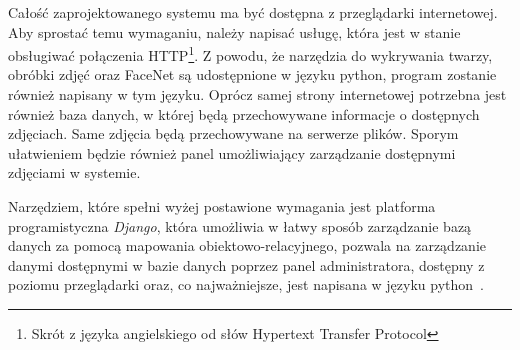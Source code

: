 Całość zaprojektowanego systemu ma być dostępna z przeglądarki internetowej.
Aby sprostać temu wymaganiu, należy napisać usługę, która jest w stanie obsługiwać połączenia
HTTP\footnote{Skrót z języka angielskiego od słów Hypertext Transfer Protocol}.
Z powodu, że narzędzia do wykrywania twarzy, obróbki zdjęć oraz FaceNet są udostępnione w języku python,
program zostanie również napisany w tym języku.
Oprócz samej strony internetowej potrzebna jest również baza danych,
w której będą przechowywane informacje o dostępnych zdjęciach.
Same zdjęcia będą przechowywane na serwerze plików.
Sporym ułatwieniem będzie również panel umożliwiający zarządzanie dostępnymi zdjęciami w systemie.

Narzędziem, które spełni wyżej postawione wymagania jest platforma programistyczna \textit{Django},
która umożliwia w łatwy sposób zarządzanie bazą danych za pomocą mapowania obiektowo-relacyjnego,
pozwala na zarządzanie danymi dostępnymi w bazie danych poprzez panel administratora, dostępny
z poziomu przeglądarki oraz, co najważniejsze, jest napisana w języku python~\cite{djangodoc}.